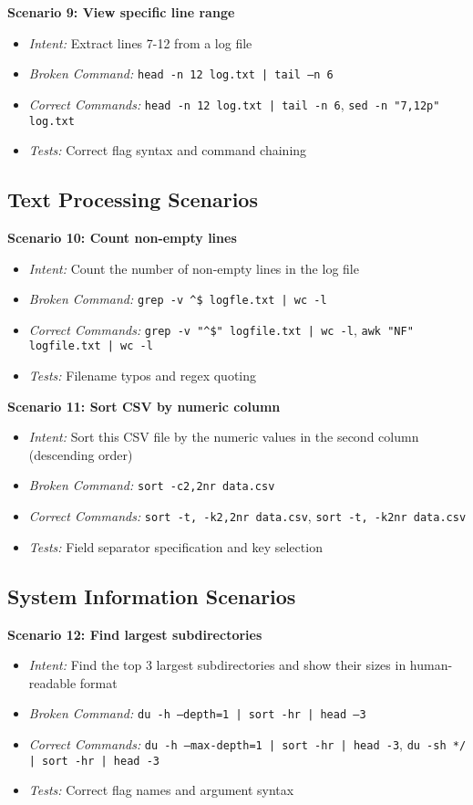 \textbf{Scenario 9: View specific line range}
\begin{itemize}
	\item \textit{Intent:} Extract lines 7-12 from a log file
	\item \textit{Broken Command:} \texttt{head -n 12 log.txt | tail --n 6}
	\item \textit{Correct Commands:} \texttt{head -n 12 log.txt | tail -n 6}, \texttt{sed -n "7,12p" log.txt}
	\item \textit{Tests:} Correct flag syntax and command chaining
\end{itemize}

\subsection{Text Processing Scenarios}

\textbf{Scenario 10: Count non-empty lines}
\begin{itemize}
	\item \textit{Intent:} Count the number of non-empty lines in the log file
	\item \textit{Broken Command:} \texttt{grep -v \^{}\$ logfle.txt | wc -l}
	\item \textit{Correct Commands:} \texttt{grep -v "\^{}\$" logfile.txt | wc -l}, \texttt{awk "NF" logfile.txt | wc -l}
	\item \textit{Tests:} Filename typos and regex quoting
\end{itemize}

\textbf{Scenario 11: Sort CSV by numeric column}
\begin{itemize}
	\item \textit{Intent:} Sort this CSV file by the numeric values in the second column (descending order)
	\item \textit{Broken Command:} \texttt{sort -c2,2nr data.csv}
	\item \textit{Correct Commands:} \texttt{sort -t, -k2,2nr data.csv}, \texttt{sort -t, -k2nr data.csv}
	\item \textit{Tests:} Field separator specification and key selection
\end{itemize}

\subsection{System Information Scenarios}

\textbf{Scenario 12: Find largest subdirectories}
\begin{itemize}
	\item \textit{Intent:} Find the top 3 largest subdirectories and show their sizes in human-readable format
	\item \textit{Broken Command:} \texttt{du -h --depth=1 | sort -hr | head --3}
	\item \textit{Correct Commands:} \texttt{du -h --max-depth=1 | sort -hr | head -3}, \texttt{du -sh */ | sort -hr | head -3}
	\item \textit{Tests:} Correct flag names and argument syntax
\end{itemize}

